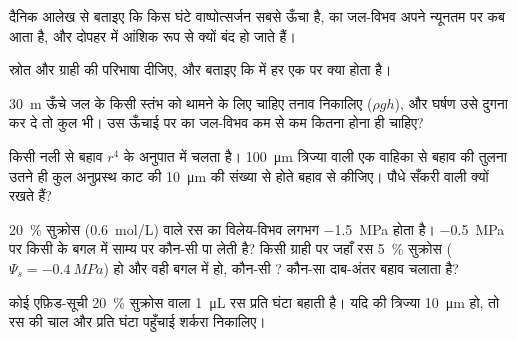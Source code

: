 \begin{exercise}[$\star$]\label{exo:b1:plant-transport:3}
दैनिक आलेख से बताइए कि किस घंटे वाष्पोत्सर्जन सबसे ऊँचा है,  का
जल-विभव अपने न्यूनतम पर कब आता है, और  दोपहर में आंशिक रूप से क्यों
बंद हो जाते हैं।
\end{exercise}

\begin{exercise}[$\star$]\label{exo:b1:plant-transport:4}
स्रोत और ग्राही की परिभाषा दीजिए, और बताइए कि  में
हर एक पर क्या होता है।
\end{exercise}

\begin{exercise}[$\star\star$]\label{exo:b1:plant-transport:5}
\qty{30}{m} ऊँचे जल के किसी स्तंभ को थामने के लिए चाहिए तनाव निकालिए
($\rho g h$), और घर्षण उसे दुगना कर दे तो कुल भी। उस ऊँचाई पर 
का जल-विभव कम से कम कितना होना ही चाहिए?
\end{exercise}

\begin{exercise}[$\star\star$]\label{exo:b1:plant-transport:6}
किसी नली से बहाव $r^4$ के अनुपात में चलता है। \qty{100}{\micro m}
त्रिज्या वाली एक वाहिका से बहाव की तुलना उतने ही कुल अनुप्रस्थ काट की
\qty{10}{\micro m}  की संख्या से होते बहाव से कीजिए। पौधे
सँकरी वाली क्यों रखते हैं?
\end{exercise}

\begin{exercise}[$\star\star$]\label{exo:b1:plant-transport:7}
\qty{20}{\%} सुक्रोस (\qty{0.6}{mol/L}) वाले  रस का विलेय-विभव
लगभग \qty{-1.5}{MPa} होता है। \qty{-0.5}{MPa} पर किसी  के बगल में
 साम्य पर कौन-सी  पा लेती है? किसी ग्राही पर जहाँ रस
\qty{5}{\%} सुक्रोस ($\Psi_s = \qty{-0.4}{MPa}$) हो और वही  बगल में
हो, कौन-सी ? कौन-सा दाब-अंतर बहाव चलाता है?
\end{exercise}

\begin{exercise}[$\star\star$]\label{exo:b1:plant-transport:8}
कोई एफ़िड-सूची \qty{20}{\%} सुक्रोस वाला \qty{1}{\micro L} रस प्रति घंटा
बहाती है। यदि  की त्रिज्या \qty{10}{\micro m} हो, तो रस की
चाल और प्रति घंटा पहुँचाई शर्करा निकालिए।
\end{exercise}

